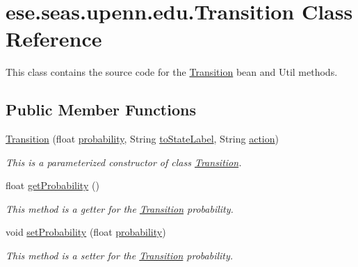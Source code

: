 \hypertarget{classese_1_1seas_1_1upenn_1_1edu_1_1_transition}{}\section{ese.\+seas.\+upenn.\+edu.\+Transition Class Reference}
\label{classese_1_1seas_1_1upenn_1_1edu_1_1_transition}


This class contains the source code for the \hyperlink{classese_1_1seas_1_1upenn_1_1edu_1_1_transition}{Transition} bean and Util methods.  


\subsection*{Public Member Functions}
\begin{DoxyCompactItemize}
\item 
\hyperlink{classese_1_1seas_1_1upenn_1_1edu_1_1_transition_ae400900946cce4a3eed16807cc4c4aac}{Transition} (float \hyperlink{classese_1_1seas_1_1upenn_1_1edu_1_1_transition_a1972203fb78b0b9a43d758e5b127a04d}{probability}, String \hyperlink{classese_1_1seas_1_1upenn_1_1edu_1_1_transition_a90ad793f29c7da83bccc4de524b9a28d}{to\+State\+Label}, String \hyperlink{classese_1_1seas_1_1upenn_1_1edu_1_1_transition_a8c04b30e9c745a0d3e0420c3ae80f77a}{action})
\begin{DoxyCompactList}\small\item\em This is a parameterized constructor of class \hyperlink{classese_1_1seas_1_1upenn_1_1edu_1_1_transition}{Transition}. \end{DoxyCompactList}\item 
float \hyperlink{classese_1_1seas_1_1upenn_1_1edu_1_1_transition_a76913b9db35b0d64278d511489ce2361}{get\+Probability} ()
\begin{DoxyCompactList}\small\item\em This method is a getter for the \hyperlink{classese_1_1seas_1_1upenn_1_1edu_1_1_transition}{Transition} probability. \end{DoxyCompactList}\item 
void \hyperlink{classese_1_1seas_1_1upenn_1_1edu_1_1_transition_aad1a0ce12182468aceac85ea0262e0ba}{set\+Probability} (float \hyperlink{classese_1_1seas_1_1upenn_1_1edu_1_1_transition_a1972203fb78b0b9a43d758e5b127a04d}{probability})
\begin{DoxyCompactList}\small\item\em This method is a setter for the \hyperlink{classese_1_1seas_1_1upenn_1_1edu_1_1_transition}{Transition} probability. \end{DoxyCompactList}\item 

\end{DoxyCompactItemize}
